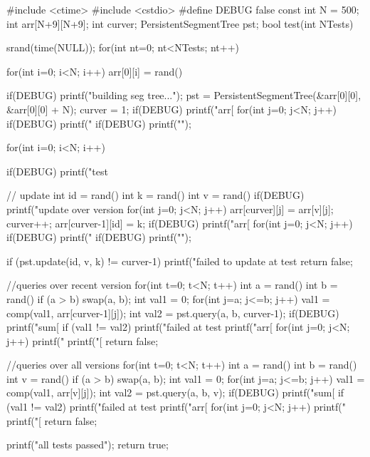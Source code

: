 \documentclass[11pt]{article}
\begin{document}
\begin{vncode}
#include <ctime>
#include <cstdio>
#define DEBUG false
const int N = 500;
int arr[N+9][N+9];
int curver;
PersistentSegmentTree pst;
bool test(int NTests) {
	srand(time(NULL));
	for(int nt=0; nt<NTests; nt++) {
		for(int i=0; i<N; i++) arr[0][i] = rand()%
		
		if(DEBUG) printf("building seg tree...\n");
		pst = PersistentSegmentTree(&arr[0][0], &arr[0][0] + N);
		curver = 1;
		if(DEBUG) printf("arr[%
		for(int j=0; j<N; j++) {
			if(DEBUG) printf(" %
		}
		if(DEBUG) printf("\n");
		
		for(int i=0; i<N; i++) {
			if(DEBUG) printf("test %
			
			// update
			int id = rand()%
			int k = rand()%
			int v = rand()%
			if(DEBUG) printf("update over version %
			for(int j=0; j<N; j++) arr[curver][j] = arr[v][j];
			curver++;
			arr[curver-1][id] = k;
			if(DEBUG) printf("arr[%
			for(int j=0; j<N; j++) {
				if(DEBUG) printf(" %
			}
			if(DEBUG) printf("\n");
			
			if (pst.update(id, v, k) != curver-1) {
				printf("failed to update at test %
				return false;
			}
			
			//queries over recent version
			for(int t=0; t<N; t++) {
				int a = rand()%
				int b = rand()%
				if (a > b) swap(a, b);
				int val1 = 0;
				for(int j=a; j<=b; j++) val1 = comp(val1, arr[curver-1][j]);
				int val2 = pst.query(a, b, curver-1);
				if(DEBUG) printf("sum[%
				if (val1 != val2) {
					printf("failed at test %
					printf("arr[%
					for(int j=0; j<N; j++) {
						printf(" %
					}
					printf("\nquery [%
					return false;
				}
			}
			
			//queries over all versions
			for(int t=0; t<N; t++) {
				int a = rand()%
				int b = rand()%
				int v = rand()%
				if (a > b) swap(a, b);
				int val1 = 0;
				for(int j=a; j<=b; j++) val1 = comp(val1, arr[v][j]);
				int val2 = pst.query(a, b, v);
				if(DEBUG) printf("sum[%
				if (val1 != val2) {
					printf("failed at test %
					printf("arr[%
					for(int j=0; j<N; j++) {
						printf(" %
					}
					printf("\nquery [%
					return false;
				}
			}		
		}
	}
	printf("all tests passed\n");
	return true;
}


\end{vncode}
\end{document}
